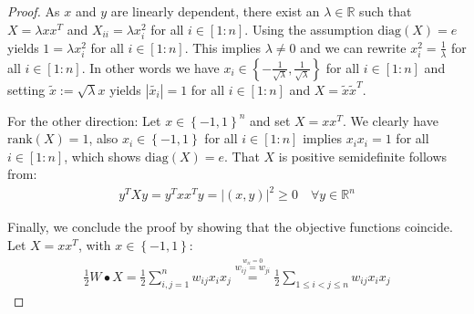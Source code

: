 \documentclass[12pt,a4paper]{article}
\theoremstyle{mythm}
\begin{document}
\begin{proof}
As $ x $ and $ y $ are linearly dependent, there exist an $ \lambda \in \mathbb{R}  $ such that $ X = \lambda x x ^T $ and $ X _{ ii } = \lambda x_i^2 $ for all $ i \in \left[
1 : n \right] $. 
Using the assumption $ \text{diag} (X) =e$ yields $ 1= \lambda x _{ i } ^{ 2 }  $ for all $ i \in \left[ 1:n \right]  $. 
This implies $ \lambda \neq 0  $ and we can rewrite $ x _{ i} ^{ 2 } = \frac{ 1 }{ \lambda  }  $ for all $ i \in \left[ 1:n \right]  $.
In other words we have $ x_i \in \left\{ - \frac{ 1 }{ \sqrt{ \lambda } } , \frac{ 1 }{ \sqrt{ \lambda } }   \right\}  $ for all $ i \in \left[ 1 : n \right] $ and setting 
$ \widetilde{ x } :=  \sqrt{ \lambda   } x $ yields $ \left| \widetilde{ x_i } \right| = 1 $ for all $ i \in \left[ 1 : n \right] $ and $ X = \widetilde{ x } \widetilde{ x } ^T  $.

For the other direction: 
Let $  x \in \left\{ -1,1 \right\} ^{ n }   $ and set $ X = x x ^T  $.
We clearly have $ \text{rank} (X) =1$, also $ x_i \in \left\{ -1,1 \right\}  $ for all $ i \in \left[ 1:n \right]  $ implies $ x_i x_i = 1 $ for all $ i \in \left[ 1:n
\right]  $, which shows $ \text{diag} (X) = e $. That $ X $ is positive semidefinite follows from:
\begin{align*}
y^T X y = y^T x x^T y = \left| (x,y) \right| ^{ 2 } \geq 0 \quad \forall y \in \mathbb{R} ^{ n } 
\end{align*} 

Finally, we conclude the proof by showing that the objective functions coincide.
Let $ X = xx^T $, with $ x \in \left\{ -1,1 \right\}  $:
\begin{align*}
\frac{ 1 }{ 2 } W \bullet X = \frac{ 1 }{ 2 } \sum_{ i,j = 1 }^{ n } w_{ij} x_i x_j \overset{ \overset{ w _{ ii } = 0}{ w _{ ij } = w _{ ji } }   }{ =} \frac{ 1 }{ 2 } \sum_{ 1
\leq i <  j \leq n   }^{  }  w _{ ij } x_i x_j
\end{align*} 
\end{proof}
\end{document}
